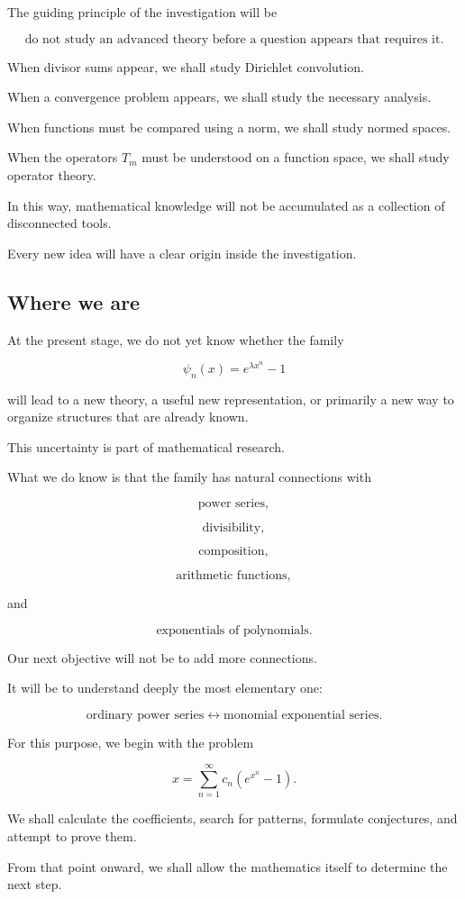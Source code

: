 The guiding principle of the investigation will be

\[
\boxed{
\text{do not study an advanced theory before a question appears that
requires it.}
}
\]

When divisor sums appear, we shall study Dirichlet convolution.

When a convergence problem appears, we shall study the necessary analysis.

When functions must be compared using a norm, we shall study normed spaces.

When the operators \(T_m\) must be understood on a function space, we shall
study operator theory.

In this way, mathematical knowledge will not be accumulated as a collection
of disconnected tools.

Every new idea will have a clear origin inside the investigation.

\subsection{Where we are}

At the present stage, we do not yet know whether the family

\[
\psi_n(x)=e^{\lambda x^n}-1
\]

will lead to a new theory, a useful new representation, or primarily a new
way to organize structures that are already known.

This uncertainty is part of mathematical research.

What we do know is that the family has natural connections with

\[
\text{power series},
\]

\[
\text{divisibility},
\]

\[
\text{composition},
\]

\[
\text{arithmetic functions},
\]

and

\[
\text{exponentials of polynomials}.
\]

Our next objective will not be to add more connections.

It will be to understand deeply the most elementary one:

\[
\boxed{
\text{ordinary power series}
\longleftrightarrow
\text{monomial exponential series}.
}
\]

For this purpose, we begin with the problem

\[
\boxed{
x
=
\sum_{n=1}^{\infty}
c_n(e^{x^n}-1).
}
\]

We shall calculate the coefficients, search for patterns, formulate
conjectures, and attempt to prove them.

From that point onward, we shall allow the mathematics itself to determine
the next step.

